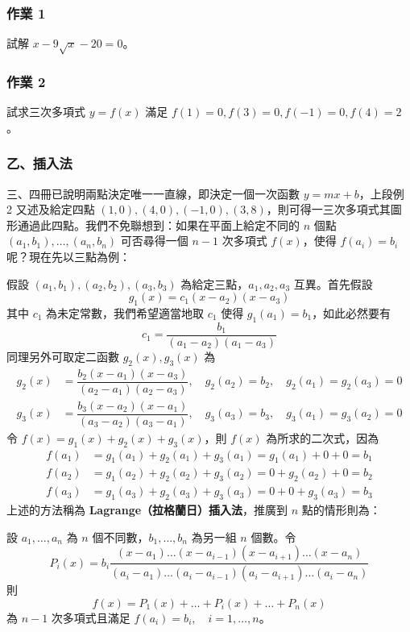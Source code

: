\subsubsection*{作業 1}\label{hw:b6s-2-1}
試解 $x - 9\sqrt{x} - 20 = 0$。

\subsubsection*{作業 2}\label{hw:b6s-2-2}
試求三次多項式 $y=f(x)$ 滿足 $f(1)=0, f(3)=0, f(-1)=0, f(4)=2$。

\subsubsection*{乙、插入法}\label{subsec:b6s-2-1-b}

三、四冊已說明兩點決定唯一一直線，即決定一個一次函數 $y=mx+b$，上段例 2 又述及給定四點 $(1, 0), (4, 0), (-1, 0), (3, 8)$，則可得一三次多項式其圖形通過此四點。我們不免聯想到：如果在平面上給定不同的 $n$ 個點 $(a_1, b_1), \dots, (a_n, b_n)$ 可否尋得一個 $n-1$ 次多項式 $f(x)$，使得 $f(a_i)=b_i$ 呢？現在先以三點為例：

假設 $(a_1, b_1), (a_2, b_2), (a_3, b_3)$ 為給定三點，$a_1, a_2, a_3$ 互異。首先假設
\[ g_1(x) = c_1(x-a_2)(x-a_3) \]
其中 $c_1$ 為未定常數，我們希望適當地取 $c_1$ 使得 $g_1(a_1)=b_1$，如此必然要有
\[ c_1 = \dfrac{b_1}{(a_1-a_2)(a_1-a_3)} \]
同理另外可取定二函數 $g_2(x), g_3(x)$ 為
\begin{align*}
g_2(x) &= \dfrac{b_2(x-a_1)(x-a_3)}{(a_2-a_1)(a_2-a_3)}, \quad g_2(a_2)=b_2, \quad g_2(a_1)=g_2(a_3)=0 \\
g_3(x) &= \dfrac{b_3(x-a_2)(x-a_1)}{(a_3-a_2)(a_3-a_1)}, \quad g_3(a_3)=b_3, \quad g_3(a_1)=g_3(a_2)=0
\end{align*}
令 $f(x) = g_1(x) + g_2(x) + g_3(x)$，則 $f(x)$ 為所求的二次式，因為
\begin{align*}
f(a_1) &= g_1(a_1) + g_2(a_1) + g_3(a_1) = g_1(a_1) + 0 + 0 = b_1 \\
f(a_2) &= g_1(a_2) + g_2(a_2) + g_3(a_2) = 0 + g_2(a_2) + 0 = b_2 \\
f(a_3) &= g_1(a_3) + g_2(a_3) + g_3(a_3) = 0 + 0 + g_3(a_3) = b_3
\end{align*}
上述的方法稱為 \textbf{Lagrange（拉格蘭日）插入法}，推廣到 $n$ 點的情形則為：

\begin{theorem}\label{thm:b6s-2-lagrange}
設 $a_1, \dots, a_n$ 為 $n$ 個不同數，$b_1, \dots, b_n$ 為另一組 $n$ 個數。令
\[ P_i(x) = b_i \dfrac{(x-a_1)\dots(x-a_{i-1})(x-a_{i+1})\dots(x-a_n)}{(a_i-a_1)\dots(a_i-a_{i-1})(a_i-a_{i+1})\dots(a_i-a_n)} \]
則
\[ f(x) = P_1(x) + \dots + P_i(x) + \dots + P_n(x) \]
為 $n-1$ 次多項式且滿足 $f(a_i)=b_i, \quad i=1, \dots, n$。
\end{theorem}

